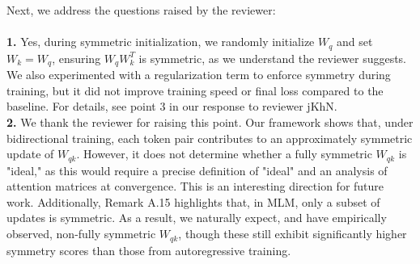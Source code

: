 \documentclass[11pt]{article}
\begin{document}
%
\\\\
Next, we address the questions raised by the reviewer:
%
\\\\
%
\textbf{1.} Yes, during symmetric initialization, we randomly initialize $W_q$ and set $W_k = W_q$, ensuring $W_qW_k^T$ is symmetric, as we understand the reviewer suggests. We also experimented with a regularization term to enforce symmetry during training, but it did not improve training speed or final loss compared to the baseline. For details, see point 3 in our response to reviewer jKhN.
%
\\
%
\textbf{2.} We thank the reviewer for raising this point. Our framework shows that, under bidirectional training, each token pair contributes to an approximately symmetric update of $W_{qk}$. However, it does not determine whether a fully symmetric $W_{qk}$ is "ideal," as this would require a precise definition of "ideal" and an analysis of attention matrices at convergence. This is an interesting direction for future work. Additionally, Remark A.15 highlights that, in MLM, only a subset of updates is symmetric. As a result, we naturally expect, and have empirically observed, non-fully symmetric $W_{qk}$, though these still exhibit significantly higher symmetry scores than those from autoregressive training.
\end{document}
